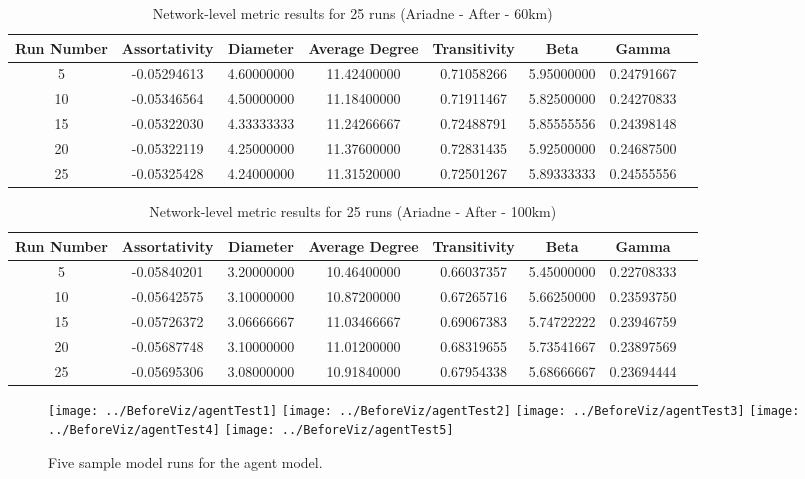 \documentclass[12pt,a4paper]{thesis}
\begin{document}
\begin{appendices}
\begin{table}[H]
\centering
\caption{Network-level metric results for 25 runs (Ariadne - After - 60km)}
\tiny
\begin{tabular}{|c|c|c|c|c|c|c|c|}
\hline Run Number & Assortativity & Diameter & Average Degree & Transitivity & Beta & Gamma \\ 
\hline	5	&	-0.05294613	&	4.60000000	&	11.42400000	&	0.71058266	&	5.95000000	&	0.24791667	\\
\hline	10	&	-0.05346564	&	4.50000000	&	11.18400000	&	0.71911467	&	5.82500000	&	0.24270833	\\
\hline	15	&	-0.05322030	&	4.33333333	&	11.24266667	&	0.72488791	&	5.85555556	&	0.24398148	\\
\hline	20	&	-0.05322119	&	4.25000000	&	11.37600000	&	0.72831435	&	5.92500000	&	0.24687500	\\
\hline	25	&	-0.05325428	&	4.24000000	&	11.31520000	&	0.72501267	&	5.89333333	&	0.24555556	\\
\hline 
\end{tabular}
\label{tab:ConvergeAriadneA60} 
\end{table}

\begin{table}[H]
\centering
\caption{Network-level metric results for 25 runs (Ariadne - After - 100km)}
\tiny
\begin{tabular}{|c|c|c|c|c|c|c|c|}
\hline Run Number & Assortativity & Diameter & Average Degree & Transitivity & Beta & Gamma \\ 
\hline	5	&	-0.05840201	&	3.20000000	&	10.46400000	&	0.66037357	&	5.45000000	&	0.22708333	\\
\hline	10	&	-0.05642575	&	3.10000000	&	10.87200000	&	0.67265716	&	5.66250000	&	0.23593750	\\
\hline	15	&	-0.05726372	&	3.06666667	&	11.03466667	&	0.69067383	&	5.74722222	&	0.23946759	\\
\hline	20	&	-0.05687748	&	3.10000000	&	11.01200000	&	0.68319655	&	5.73541667	&	0.23897569	\\
\hline	25	&	-0.05695306	&	3.08000000	&	10.91840000	&	0.67954338	&	5.68666667	&	0.23694444	\\
\hline 
\end{tabular}
\label{tab:ConvergeAriadneA100} 
\end{table}


\begin{figure}[H]
\centering
\texttt{[image: ../BeforeViz/agentTest1]}
\texttt{[image: ../BeforeViz/agentTest2]}
\texttt{[image: ../BeforeViz/agentTest3]}
\texttt{[image: ../BeforeViz/agentTest4]}
\texttt{[image: ../BeforeViz/agentTest5]}
\caption{Five sample model runs for the agent model.}
\label{fig:agentFluctuations}
\end{figure}



\end{appendices}
\end{document}
